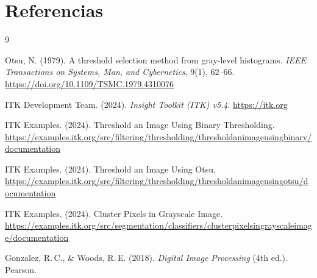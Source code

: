 \documentclass[12pt, a4paper]{article}
\begin{document}
\section*{Referencias}

\begin{thebibliography}{9}

  Otsu, N. (1979).
  A threshold selection method from gray-level histograms.
  \textit{IEEE Transactions on Systems, Man, and Cybernetics}, 9(1), 62--66.
  \url{https://doi.org/10.1109/TSMC.1979.4310076}

  ITK Development Team. (2024).
  \textit{Insight Toolkit (ITK) v5.4}.
  \url{https://itk.org}

  ITK Examples. (2024).
  Threshold an Image Using Binary Thresholding.
  \url{https://examples.itk.org/src/filtering/thresholding/thresholdanimageusingbinary/documentation}

  ITK Examples. (2024).
  Threshold an Image Using Otsu.
  \url{https://examples.itk.org/src/filtering/thresholding/thresholdanimageusingotsu/documentation}

  ITK Examples. (2024).
  Cluster Pixels in Grayscale Image.
  \url{https://examples.itk.org/src/segmentation/classifiers/clusterpixelsingrayscaleimage/documentation}

  Gonzalez, R.\,C., \& Woods, R.\,E. (2018).
  \textit{Digital Image Processing} (4th ed.).
  Pearson.

\end{thebibliography}
\end{document}
